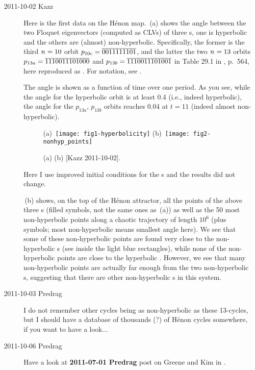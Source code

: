 \begin{description}
\item[2011-10-02 Kazz]
Here is the first data on the H\'enon map.
\,(a) shows the angle between the two
Floquet eigenvectors (computed as CLVs) of three \po s, one is hyperbolic
and the others are (almost) non-hyperbolic. Specifically, the former is
the third ${n_{}}=10$ orbit $p_{10c} = {\overline{0011111101}}$, and the latter
the two ${n_{}}=13$ orbits $p_{13a} = {\overline{1110011101000}}$ and $p_{13b}
= {\overline{1110011101001}}$ in Table 29.1 in
,
p.~564, here reproduced as . For notation, see
.

The angle is shown as a function of time over one period. As you
see, while the angle for the hyperbolic orbit is at least 0.4 (i.e.,
indeed hyperbolic), the angle for the $p_{13a}$, $p_{13b}$ orbits reaches 0.04
at $t=11$ (indeed almost non-hyperbolic).

\begin{figure}
 (a)~\texttt{[image: fig1-hyperbolicity]}
 (b)~\texttt{[image: fig2-nonhyp\_points]}
\caption{
(a)
(b)
[Kazz 2011-10-02].
}
\label{fig:HenonNonHypPoints}
\end{figure}

Here I use improved initial conditions for the \po s and the results did
not change.

\,(b) shows, on the top of the H\'enon attractor,
all the points of the above three \po s (filled symbols, not the same ones
as \,(a)) as well as the 50 most non-hyperbolic
points along a chaotic trajectory of length $10^6$ (plus symbols; most
non-hyperbolic means smallest angle here). We see that some of these
non-hyperbolic points are found very close to the non-hyperbolic \po s
(see inside the light blue rectangles), while none of the non-hyperbolic
points are close to the hyperbolic \po. However, we see that many
non-hyperbolic points are actually far enough from the two non-hyperbolic
\po s, suggesting that there are other non-hyperbolic \po s in this system.

\item[2011-10-03 Predrag] I do not remember other cycles being as
non-hyperbolic as these 13-cycles, but I should have a database of
thousands (?) of  H\'enon cycles somewhere, if you want to have a look...

\item[2011-10-06 Predrag]
Have a look at {\bf 2011-07-01 Predrag} post on Greene and Kim
in .


\end{description}
